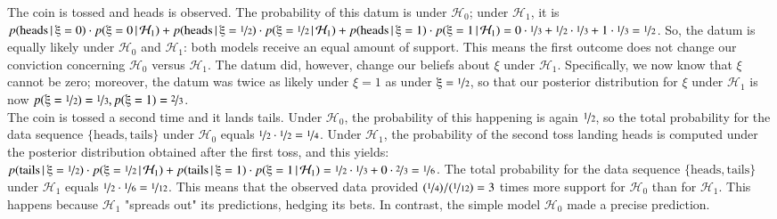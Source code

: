 \documentclass[man, floatsintext]{apa7} %
\newcommand{\given}{\, | \,}
\begin{document}
The coin is tossed and heads is observed. The probability of this datum is  under $\mathcal{H}_0$; under $\mathcal{H}_1$, it is $p(\text{heads} \given \xi=0) \cdot p(\xi=0 \given \mathcal{H}_1) + p(\text{heads} \given \xi=\nicefrac{1}{2}) \cdot p(\xi=\nicefrac{1}{2} \given \mathcal{H}_1) + p(\text{heads} \given \xi=1) \cdot p(\xi=1 \given \mathcal{H}_1) = 0 \cdot \nicefrac{1}{3}  + \nicefrac{1}{2} \cdot \nicefrac{1}{3} + 1 \cdot \nicefrac{1}{3} = \nicefrac{1}{2}$. So, the datum is equally likely under $\mathcal{H}_0$ and $\mathcal{H}_1$: both models receive an equal amount of support. This means the first outcome does not change our conviction concerning $\mathcal{H}_0$ versus $\mathcal{H}_1$. The datum did, however, change our beliefs about $\xi$ under $\mathcal{H}_1$. Specifically, we now know that $\xi$ cannot be zero; moreover, the datum was twice as likely under $\xi=1$ as under $\xi = \nicefrac{1}{2}$, so that our posterior distribution for $\xi$ under $\mathcal{H}_1$ is now $p(\xi = \nicefrac{1}{2}) = \nicefrac{1}{3}, p(\xi = 1) = \nicefrac{2}{3}$. \\

The coin is tossed a second time and it lands tails. Under $\mathcal{H}_0$, the probability of this happening is again $\nicefrac{1}{2}$, so the total probability for the data sequence $\{\text{heads}, \text{tails}\}$ under $\mathcal{H}_0$ equals $\nicefrac{1}{2} \cdot \nicefrac{1}{2} = \nicefrac{1}{4}$. Under $\mathcal{H}_1$, the probability of the second toss landing heads is computed under the posterior distribution obtained after the first toss, and this yields: $p(\text{tails} \given \xi = \nicefrac{1}{2}) \cdot p(\xi=\nicefrac{1}{2} \given \mathcal{H}_1) + p(\text{tails} \given \xi = 1) \cdot p(\xi=1 \given \mathcal{H}_1) = \nicefrac{1}{2} \cdot \nicefrac{1}{3} + 0 \cdot \nicefrac{2}{3} = \nicefrac{1}{6}$. The total probability for the data sequence $\{\text{heads}, \text{tails}\}$ under $\mathcal{H}_1$ equals $\nicefrac{1}{2} \cdot \nicefrac{1}{6} = \nicefrac{1}{12}$. This means that the observed data provided $(\nicefrac{1}{4}) / (\nicefrac{1}{12}) = 3$ times more support for $\mathcal{H}_0$ than for $\mathcal{H}_1$. This happens because $\mathcal{H}_1$ "spreads out" its predictions, hedging its bets. In contrast, the simple model $\mathcal{H}_0$ made a precise prediction. \\
\end{document}
